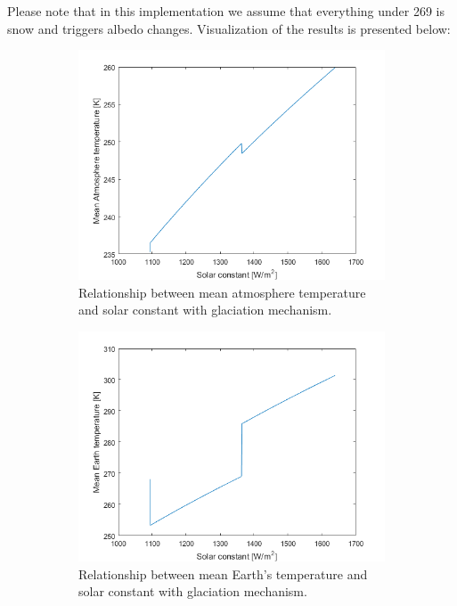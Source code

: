 \documentclass[12pt]{article}
\begin{document}
 

Please note that in this implementation we assume that everything under 269 is snow and triggers albedo changes. Visualization of the results is presented below:

\begin{figure}[H]
	\centering
	\begin{subfigure}[b]{0.8\textwidth}   
		\centering 
		\includegraphics[width=\textwidth]{glac_atm}
		{{\small Relationship between mean atmosphere temperature and solar constant with glaciation mechanism.}}    
	\end{subfigure}
	\begin{subfigure}[b]{0.8\textwidth}   
		\centering 
		\includegraphics[width=\textwidth]{glac_earth}
		{{\small Relationship between mean Earth's temperature and solar constant with glaciation mechanism.}}    
	\end{subfigure}
\end{figure}
\end{document}
